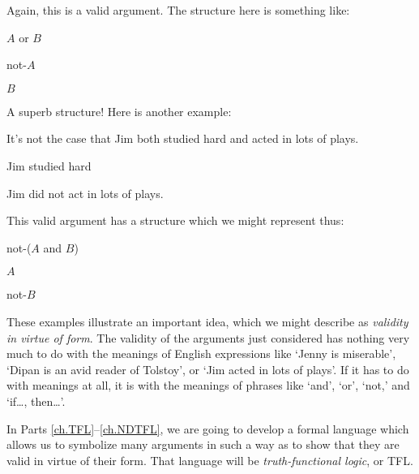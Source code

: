 Again, this is a valid argument. The structure here is something like:
	\begin{earg}
		\item[] $A$ or $B$
		\item[] not-$A$
		\item[\therefore] $B$
	\end{earg}
A superb structure! Here is another example:
	\begin{earg}
		\item[] It's not the case that Jim both studied hard and acted in lots of plays.
		\item[] Jim studied hard
		\item[\therefore] Jim did not act in lots of plays.
	\end{earg}
This valid argument has a structure which we might represent thus:
	\begin{earg}
		\item[] not-($A$ and $B$)
		\item[] $A$
		\item[\therefore] not-$B$
	\end{earg}
These examples illustrate an important idea, which we might describe as \emph{validity in virtue of form}. The validity of the arguments just considered has nothing very much to do with the meanings of English expressions like `Jenny is miserable', `Dipan is an avid reader of Tolstoy', or `Jim acted in lots of plays'. If it has to do with meanings at all, it is with the meanings of phrases like `and', `or', `not,' and `if\ldots, then\ldots'.

In Parts \ref{ch.TFL}--\ref{ch.NDTFL}, we are going to develop a formal language which allows us to symbolize many arguments in such a way as to show that they are valid in virtue of their form. That language will be \emph{truth-functional logic}, or TFL.

